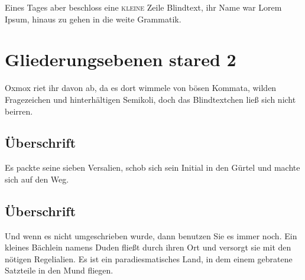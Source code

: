 \documentclass[%
	12pt,%
	a4paper,%
	oneside,%
	listof=totoc,
 	index=totoc,
	bibliography = totoc,
	parskip = half,%
	chapterprefix=false,%
	appendixprefix, %
headings=small,%
]{scrreprt}
\begin{document}
Eines Tages aber beschloss eine \textsc{kleine} Zeile Blindtext, ihr Name war Lorem Ipsum, hinaus zu gehen in die weite Grammatik.

\chapter*{Gliederungsebenen stared 2}
\label{sec:Gliederung4}

Oxmox riet ihr davon ab, da es dort wimmele von bösen Kommata, wilden Fragezeichen und hinterhältigen Semikoli, doch das Blindtextchen ließ sich nicht beirren. 

\section*{Überschrift}

Es packte seine sieben Versalien, schob sich sein Initial in den Gürtel und machte sich auf den Weg. 

%
%

\section*{Überschrift}
Und wenn es nicht umgeschrieben wurde, dann benutzen Sie es immer noch. Ein kleines Bächlein namens Duden fließt durch ihren Ort und versorgt sie mit den nötigen Regelialien. Es ist ein paradiesmatisches Land, in dem einem gebratene Satzteile in den Mund fliegen. 
\end{document}
